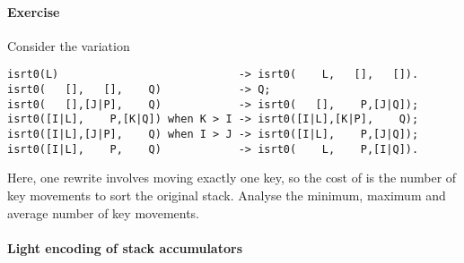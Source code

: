 \paragraph{Exercise}

Consider the variation 
{\small
\begin{verbatim}
isrt0(L)                            -> isrt0(    L,   [],   []).
isrt0(   [],   [],    Q)            -> Q;
isrt0(   [],[J|P],    Q)            -> isrt0(   [],    P,[J|Q]);
isrt0([I|L],    P,[K|Q]) when K > I -> isrt0([I|L],[K|P],    Q);
isrt0([I|L],[J|P],    Q) when I > J -> isrt0([I|L],    P,[J|Q]);
isrt0([I|L],    P,    Q)            -> isrt0(    L,    P,[I|Q]).
\end{verbatim}
}
Here, one rewrite involves moving exactly one key, so the cost of
 is the number of key movements to sort the original
stack. Analyse the minimum, maximum and average number of key
movements.

\paragraph{Light encoding of stack accumulators}

